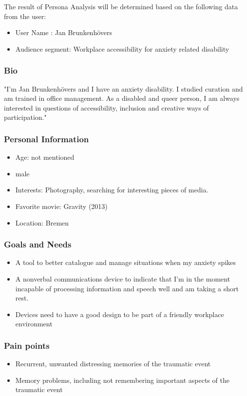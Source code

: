 The result of Persona Analysis will be determined based on the following data from the user:

\begin{itemize}
    \item User Name : Jan Brunkenhövers
    \item Audience segment: Workplace accessibility for anxiety related disability
\end{itemize}
\subsubsection*{Bio}
    "I’m Jan Brunkenhövers and I have an anxiety disability. I studied curation and am trained in office management. As a disabled and queer person, I am always interested in questions of accessibility, inclusion and creative ways of participation."
\subsubsection*{Personal Information}
\begin{itemize}
\item Age: not mentioned
\item male
\item Interests: Photography, searching for interesting pieces of media.
\item Favorite movie: Gravity (2013)
\item Location: Bremen 
\end{itemize}
\subsubsection*{Goals and Needs}
\begin{itemize}
    \item A tool to better catalogue and manage situations when my anxiety spikes
    \item A nonverbal communications device to indicate that I’m in the moment incapable of processing information and speech well and am taking a short rest.
    \item Devices need to have a good design to be part of a friendly workplace environment   
\end{itemize}

\subsubsection*{Pain points}
\begin{itemize}
    \item Recurrent, unwanted distressing memories of the traumatic event
    \item Memory problems, including not remembering important aspects of the traumatic event
\end{itemize}

